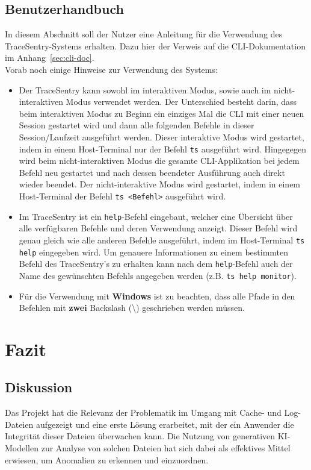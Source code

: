 \documentclass[a4paper,12pt]{report}
\begin{document}
    \clearpage


    \section{Benutzerhandbuch}
    \label{sec:user-manual}
    In diesem Abschnitt soll der Nutzer eine Anleitung für die Verwendung des TraceSentry-Systems erhalten.
    Dazu hier der Verweis auf die CLI-Dokumentation im Anhang~\ref{sec:cli-doc}.
    \\
    Vorab noch einige Hinweise zur Verwendung des Systems:
    \begin{itemize}
        \item Der TraceSentry kann sowohl im interaktiven Modus, sowie auch im nicht-interaktiven Modus verwendet werden.
        Der Unterschied besteht darin, dass beim interaktiven Modus zu Beginn ein einziges Mal die CLI mit einer neuen Session gestartet wird und
        dann alle folgenden Befehle in dieser Session/Laufzeit ausgeführt werden.
        Dieser interaktive Modus wird gestartet, indem in einem Host-Terminal nur der Befehl \texttt{ts} ausgeführt wird.
        Hingegegen wird beim nicht-interaktiven Modus die gesamte CLI-Applikation bei jedem Befehl neu gestartet und nach dessen beendeter Ausführung auch direkt wieder beendet.
        Der nicht-interaktive Modus wird gestartet, indem in einem Host-Terminal der Befehl \texttt{ts <Befehl>} ausgeführt wird.
        \item Im TraceSentry ist ein \texttt{help}-Befehl eingebaut, welcher eine Übersicht über alle verfügbaren Befehle und deren Verwendung anzeigt.
        Dieser Befehl wird genau gleich wie alle anderen Befehle ausgeführt, indem im Host-Terminal \texttt{ts help} eingegeben wird.
        Um genauere Informationen zu einem bestimmten Befehl des TraceSentry's zu erhalten kann nach dem \texttt{help}-Befehl auch der Name des gewünschten Befehls angegeben werden (z.B. \texttt{ts help monitor}).
        \item Für die Verwendung mit \textbf{Windows} ist zu beachten, dass alle Pfade in den Befehlen mit \textbf{zwei} Backslash (\textbackslash) geschrieben werden müssen.
    \end{itemize}


    \chapter{Fazit}


    \section{Diskussion}
    Das Projekt hat die Relevanz der Problematik im Umgang mit Cache- und Log-Dateien aufgezeigt und eine erste Lösung erarbeitet, mit der ein Anwender die Integrität dieser Dateien überwachen kann.
    Die Nutzung von generativen KI-Modellen zur Analyse von solchen Dateien hat sich dabei als effektives Mittel erwiesen, um Anomalien zu erkennen und einzuordnen.
\end{document}
